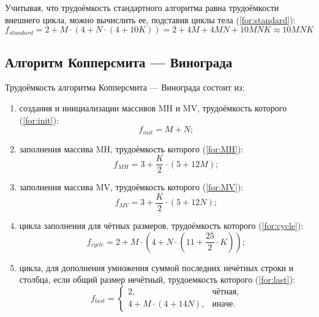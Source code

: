 Учитывая, что трудоёмкость стандартного алгоритма равна трудоёмкости внешнего цикла, можно вычислить ее, подставив циклы тела (\ref{for:standard}):
\begin{equation}
    \label{for:standard}
    f_{standard} = 2 + M \cdot (4 + N \cdot (4 + 10K)) = 2 + 4M + 4MN + 10MNK \approx 10MNK
\end{equation}

\subsection{Алгоритм Копперсмита — Винограда}

Трудоёмкость алгоритма Копперсмита — Винограда состоит из:
\begin{enumerate}
    \item создания и инициализации массивов MH и MV, трудоёмкость которого (\ref{for:init}):
        \begin{equation}
            \label{for:init}
        f_{init} = M + N;
        \end{equation}

    \item заполнения массива MH, трудоёмкость которого (\ref{for:MH}):
        \begin{equation}
            \label{for:MH}
        f_{MH} = 3 + \frac{K}{2} \cdot (5 + 12M);
        \end{equation}

    \item заполнения массива MV, трудоёмкость которого (\ref{for:MV}):
        \begin{equation}
            \label{for:MV}
        f_{MV} = 3 + \frac{K}{2} \cdot (5 + 12N);
        \end{equation}

    \item цикла заполнения для чётных размеров, трудоёмкость которого (\ref{for:cycle}):
        \begin{equation}
            \label{for:cycle}
        f_{cycle} = 2 + M \cdot (4 + N \cdot (11 + \frac{25}{2} \cdot K));
        \end{equation}

    \item цикла, для дополнения умножения суммой последних нечётных строки и столбца, если общий размер нечётный, трудоемкость которого (\ref{for:last}):
        \begin{equation}
            \label{for:last}
            f_{last} = \begin{cases}
                2, & \text{чётная,}\\
                4 + M \cdot (4 + 14N), & \text{иначе.}
            \end{cases}
        \end{equation}
\end{enumerate}

